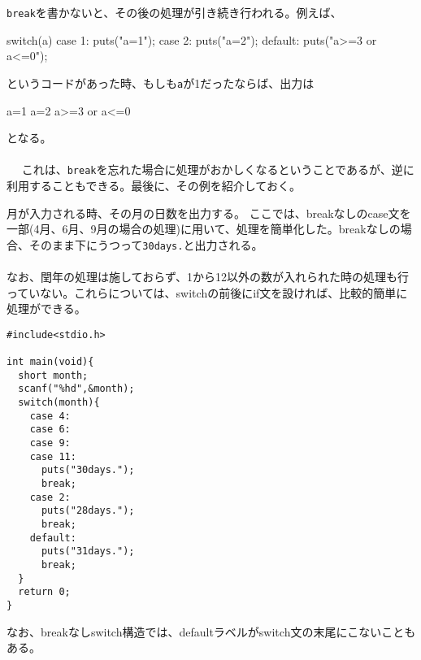 \verb|break|を書かないと、その後の処理が引き続き行われる。例えば、
\begin{code}
switch(a){
  case 1:
    puts("a=1");
  case 2:
    puts("a=2");
  default:
    puts("a>=3 or a<=0");
}
\end{code}
というコードがあった時、もしも\verb|a|が1だったならば、出力は
\begin{code}
a=1
a=2
a>=3 or a<=0
\end{code}
となる。
\\ \\　
これは、\verb|break|を忘れた場合に処理がおかしくなるということであるが、逆に利用することもできる。最後に、その例を紹介しておく。
\begin{boxnote}
\begin{multicols}{2}
月が入力される時、その月の日数を出力する。
ここでは、breakなしのcase文を一部(4月、6月、9月の場合の処理)に用いて、処理を簡単化した。breakなしの場合、そのまま下にうつって\verb|30days.|と出力される。\\ \\なお、閏年の処理は施しておらず、1から12以外の数が入れられた時の処理も行っていない。これらについては、switchの前後にif文を設ければ、比較的簡単に処理ができる。
\begin{lstlisting}[caption=月の日数,label=program4_5]
#include<stdio.h>

int main(void){
  short month;
  scanf("%hd",&month);
  switch(month){
    case 4:
    case 6:
    case 9:
    case 11:
      puts("30days.");
      break;
    case 2:
      puts("28days.");
      break;
    default:
      puts("31days.");
      break;
  }
  return 0;
}
\end{lstlisting}
\end{multicols}
\end{boxnote}

なお、breakなしswitch構造では、defaultラベルがswitch文の末尾にこないこともある。

